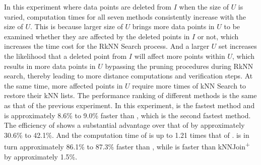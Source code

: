 In this experiment where data points are deleted from $I$ when the size of $U$ is varied, computation times for all seven methods consistently increase with the size of $U$. This is because larger size of $U$ brings more data points in $U$ to be examined whether they are affected by the deleted points in $I$ or not, which increases the time cost for the RkNN Search process. And a larger $U$ set increases the likelihood that a deleted point from $I$ will affect more points within $U$, which results in more data points in $U$ bypassing the pruning procedures during RkNN search, thereby leading to more distance computations and verification steps. At the same time, more affected points in $U$ require more times of kNN Search to restore their kNN lists. The performance ranking of different methods is the same as that of the previous experiment. In this experiment, \cpdualtree is the fastest method and is approximately 8.6\% to 9.0\% faster than \spdualtree, which is the second fastest method. The efficiency of \spdualtree shows a substantial advantage over that of \dualtree by approximately 30.6\% to 42.1\%. And the computation time of \deltatree is up to 1.21 times that of \dualtree. \deltatree is in turn approximately 86.1\% to 87.3\% faster than \hdrtree, while \hdrtree is faster than kNNJoin\textsuperscript{+} by approximately 1.5\%.

